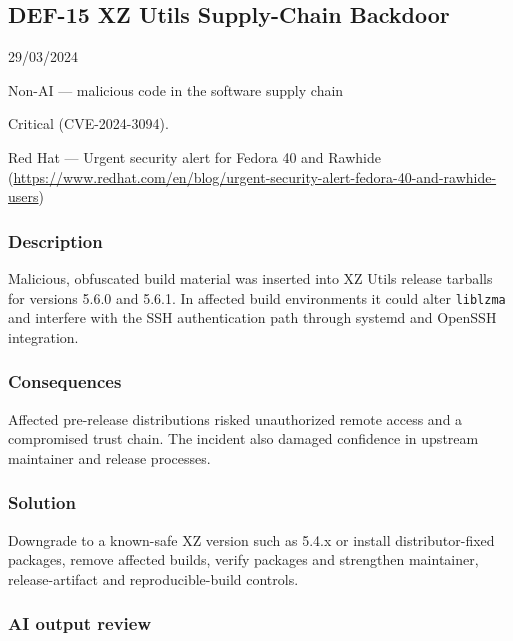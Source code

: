\subsection{DEF-15 XZ Utils Supply-Chain Backdoor}

\begin{description}[style=nextline,leftmargin=3.2cm]

\item[Publicized] 29/03/2024

\item[Category] Non-AI — malicious code in the software supply chain

\item[Severity] Critical (CVE-2024-3094).

\item[Source] Red Hat — Urgent security alert for Fedora 40 and Rawhide (\url{https://www.redhat.com/en/blog/urgent-security-alert-fedora-40-and-rawhide-users})

\end{description}

\subsubsection{Description}

Malicious, obfuscated build material was inserted into XZ Utils release tarballs for versions 5.6.0 and 5.6.1. In affected build environments it could alter \texttt{liblzma} and interfere with the SSH authentication path through systemd and OpenSSH integration.

\subsubsection{Consequences}

Affected pre-release distributions risked unauthorized remote access and a compromised trust chain. The incident also damaged confidence in upstream maintainer and release processes.

\subsubsection{Solution}

Downgrade to a known-safe XZ version such as 5.4.x or install distributor-fixed packages, remove affected builds, verify packages and strengthen maintainer, release-artifact and reproducible-build controls.

\subsubsection{AI output review}

